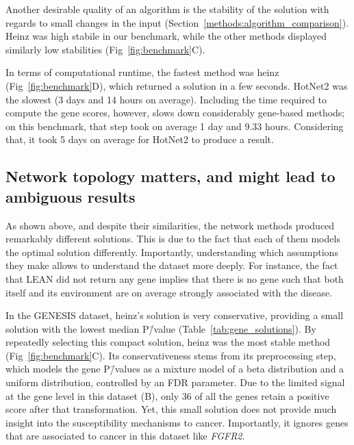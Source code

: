 \documentclass[10pt,letterpaper]{article}
\begin{document}
Another desirable quality of an algorithm is the stability of the solution with regards to small changes in the input (Section~\ref{methods:algorithm_comparison}). Heinz was high stabile in our benchmark, while the other methods displayed similarly low stabilities (Fig~\ref{fig:benchmark}C).

In terms of computational runtime, the fastest method was heinz (Fig~\ref{fig:benchmark}D), which returned a solution in a few seconds. HotNet2 was the slowest (3 days and 14 hours on average). Including the time required to compute the gene scores, however, slows down considerably gene-based methods; on this benchmark, that step took on average 1 day and 9.33 hours. Considering that, it took 5 days on average for HotNet2 to produce a result.

\subsection{Network topology matters, and might lead to ambiguous results}
\label{results:drawbacks}

As shown above, and despite their similarities, the network methods produced remarkably different solutions. This is due to the fact that each of them models the optimal solution differently. Importantly, understanding which assumptions they make allows to understand the dataset more deeply. For instance, the fact that LEAN did not return any gene implies that there is no gene such that both itself and its environment are on average strongly associated with the disease.

In the GENESIS dataset, heinz's solution is very conservative, providing a small solution with the lowest median P\=/value (Table~\ref{tab:gene_solutions}). By repeatedly selecting this compact solution, heinz was the most stable method (Fig~\ref{fig:benchmark}C). Its conservativeness stems from its preprocessing step, which models the gene P\=/values as a mixture model of a beta distribution and a uniform distribution, controlled by an FDR parameter. Due to the limited signal at the gene level in this dataset (B), only 36 of all the genes retain a positive score after that transformation. Yet, this small solution does not provide much insight into the susceptibility mechanisms to cancer. Importantly, it ignores genes that are associated to cancer in this dataset like \emph{FGFR2}. 
\end{document}
